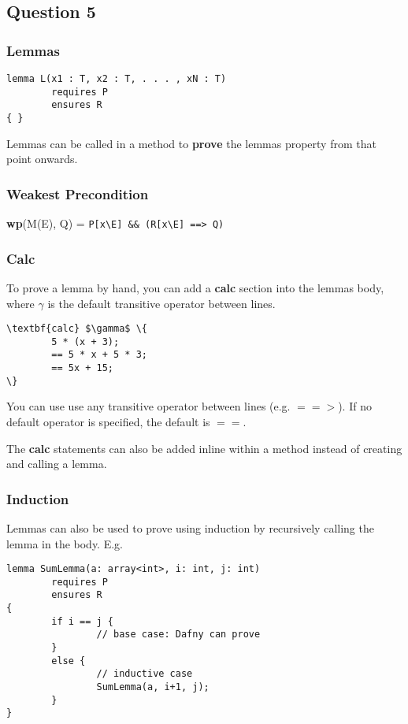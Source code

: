 \subsection{Question 5}

\subsubsection{Lemmas}
\begin{verbatim}
lemma L(x1 : T, x2 : T, . . . , xN : T)
        requires P
        ensures R
{ }
\end{verbatim}

Lemmas can be called in a method to \textbf{prove} the lemmas property from that point onwards.

\subsubsection{Weakest Precondition}
\textbf{wp}(M(E), Q)  =  \verb!P[x\E] && (R[x\E] ==> Q)!

\subsubsection{Calc}
To prove a lemma by hand, you can add a \textbf{calc} section into the lemmas body, where \textit{$\gamma$} is the default transitive operator between lines.
\begin{Verbatim}[commandchars=\\\{\}, codes={\catcode`$=3\catcode`^=7}]
\textbf{calc} $\gamma$ \{
        5 * (x + 3);
        == 5 * x + 5 * 3;
        == 5x + 15;
\}
\end{Verbatim}

You can use use any transitive operator between lines (e.g. $==>$). If no default operator is specified, the default is $==$.

The \textbf{calc} statements can also be added inline within a method instead of creating and calling a lemma.

\subsubsection{Induction}
Lemmas can also be used to prove using induction by recursively calling the lemma in the body. E.g. \\
\begin{Verbatim}
lemma SumLemma(a: array<int>, i: int, j: int)
        requires P
        ensures R
{
        if i == j {
                // base case: Dafny can prove
        }
        else { 
                // inductive case
                SumLemma(a, i+1, j); 
        }
} 
\end{Verbatim}

